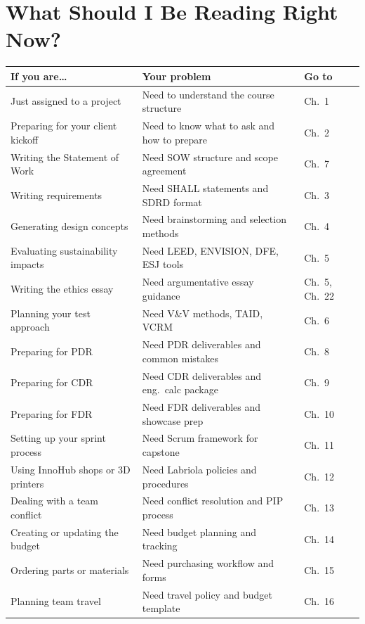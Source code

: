 \chapter*{What Should I Be Reading Right Now?}

\begin{center}\small
\begin{tabularx}{\textwidth}{l X l}
\toprule
\textbf{If you are\ldots} & \textbf{Your problem} & \textbf{Go to} \\
\midrule
Just assigned to a project & Need to understand the course structure & Ch.~1 \\
Preparing for your client kickoff & Need to know what to ask and how to prepare & Ch.~2 \\
Writing the Statement of Work & Need SOW structure and scope agreement & Ch.~7 \\
Writing requirements & Need SHALL statements and SDRD format & Ch.~3 \\
Generating design concepts & Need brainstorming and selection methods & Ch.~4 \\
Evaluating sustainability impacts & Need LEED, ENVISION, DFE, ESJ tools & Ch.~5 \\
Writing the ethics essay & Need argumentative essay guidance & Ch.~5, Ch.~22 \\
Planning your test approach & Need V\&V methods, TAID, VCRM & Ch.~6 \\
Preparing for PDR & Need PDR deliverables and common mistakes & Ch.~8 \\
Preparing for CDR & Need CDR deliverables and eng.\ calc package & Ch.~9 \\
Preparing for FDR & Need FDR deliverables and showcase prep & Ch.~10 \\
Setting up your sprint process & Need Scrum framework for capstone & Ch.~11 \\
Using InnoHub shops or 3D printers & Need Labriola policies and procedures & Ch.~12 \\
Dealing with a team conflict & Need conflict resolution and PIP process & Ch.~13 \\
Creating or updating the budget & Need budget planning and tracking & Ch.~14 \\
Ordering parts or materials & Need purchasing workflow and forms & Ch.~15 \\
Planning team travel & Need travel policy and budget template & Ch.~16 \\

\end{tabularx}
\end{center}
